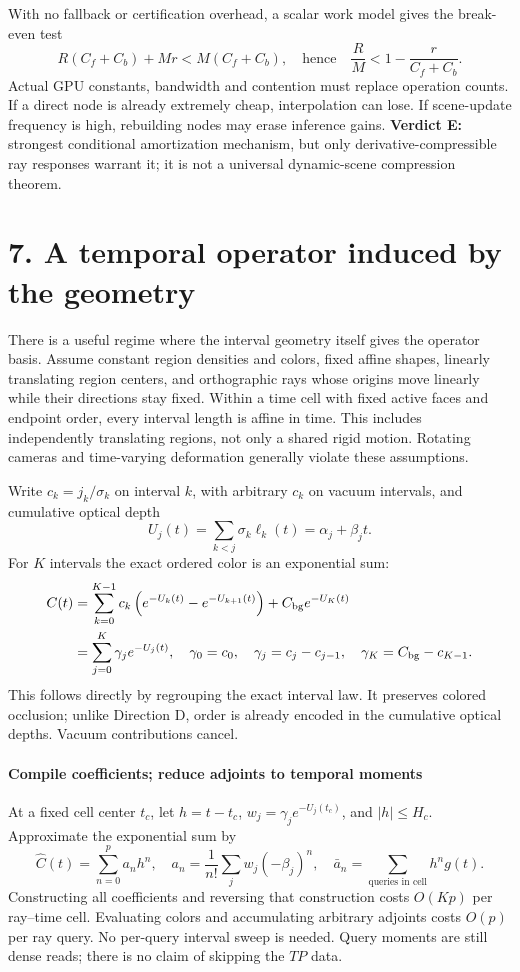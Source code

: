 \documentclass[11pt,letterpaper]{article}
\newcommand{\pagehead}[2]{\newpage\section*{#1}\vspace{-3pt}{\small\sffamily\color{ink}#2}\par\vspace{4pt}}
\newcommand{\mini}[1]{\paragraph{#1}}
\begin{document}
With no fallback or certification overhead, a scalar work model gives the break-even test
\begin{equation}
 R(C_f+C_b)+Mr < M(C_f+C_b),\quad\text{hence}\quad
 \frac RM < 1-\frac r{C_f+C_b}. \label{eq:breakeven}
\end{equation}
Actual GPU constants, bandwidth and contention must replace operation counts. If a direct node is already extremely cheap, interpolation can lose. If scene-update frequency is high, rebuilding nodes may erase inference gains. \textbf{Verdict E:} strongest conditional amortization mechanism, but only derivative-compressible ray responses warrant it; it is not a universal dynamic-scene compression theorem.

\pagehead{7. A temporal operator induced by the geometry}{DEEPENING B + E / MORE THAN AN ARBITRARY IMAGE CACHE}
There is a useful regime where the interval geometry itself gives the operator basis. Assume constant region densities and colors, fixed affine shapes, linearly translating region centers, and orthographic rays whose origins move linearly while their directions stay fixed. Within a time cell with fixed active faces and endpoint order, every interval length is affine in time. This includes independently translating regions, not only a shared rigid motion. Rotating cameras and time-varying deformation generally violate these assumptions.

Write $c_k=j_k/\sigma_k$ on interval $k$, with arbitrary $c_k$ on vacuum intervals, and cumulative optical depth
\begin{equation}
 U_j(t)=\sum_{k<j}\sigma_k\ell_k(t)=\alpha_j+\beta_jt.
\end{equation}
For $K$ intervals the exact ordered color is an exponential sum:
\begin{align}
 C(t)&=\sum_{k=0}^{K-1}c_k\left(e^{-U_k(t)}-e^{-U_{k+1}(t)}\right)+C_{\rm bg}e^{-U_K(t)} \\
 &=\sum_{j=0}^{K}\gamma_j e^{-U_j(t)},\quad
 \gamma_0=c_0,\quad\gamma_j=c_j-c_{j-1},\quad\gamma_K=C_{\rm bg}-c_{K-1}.
 \label{eq:expsum}
\end{align}
This follows directly by regrouping the exact interval law. It preserves colored occlusion; unlike Direction D, order is already encoded in the cumulative optical depths. Vacuum contributions cancel.

\mini{Compile coefficients; reduce adjoints to temporal moments}
At a fixed cell center $t_c$, let $h=t-t_c$, $w_j=\gamma_je^{-U_j(t_c)}$, and $|h|\le H_c$. Approximate the exponential sum by
\begin{equation}
 \widehat C(t)=\sum_{n=0}^{p}a_nh^n,\quad
 a_n=\frac1{n!}\sum_jw_j(-\beta_j)^n,\quad
 \bar a_n=\sum_{\text{queries in cell}}h^n g(t). \label{eq:expmoments}
\end{equation}
Constructing all coefficients and reversing that construction costs $O(Kp)$ per ray--time cell. Evaluating colors and accumulating arbitrary adjoints costs $O(p)$ per ray query. No per-query interval sweep is needed. Query moments are still dense reads; there is no claim of skipping the $TP$ data.
\end{document}
